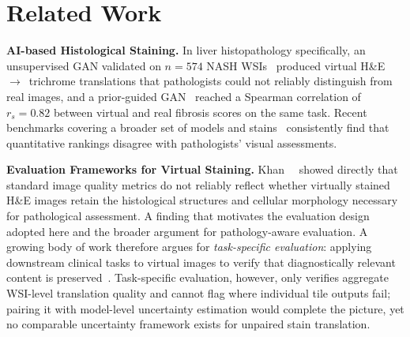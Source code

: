 \section{Related Work}
\label{sec:related_work}

\noindent\textbf{AI-based Histological Staining.}
In liver histopathology specifically, an unsupervised GAN validated on $n{=}574$ NASH
WSIs~\cite{kieffer2020largescale} produced virtual H\&E~$\to$~trichrome translations
that pathologists could not reliably distinguish from real images, and a prior-guided
GAN~\cite{li2023unpaired} reached a Spearman correlation of $r_s{=}0.82$ between virtual
and real fibrosis scores on the same task.
Recent benchmarks covering a broader set of models and stains~\cite{visgab2025,
staindiffuser2024, klockner2025he} consistently find that quantitative rankings disagree
with pathologists' visual assessments.

\noindent\textbf{Evaluation Frameworks for Virtual Staining.}
Khan~\etal~\cite{khan2023effect} showed directly that standard image quality metrics do
not reliably reflect whether virtually stained H\&E images retain the histological structures 
and cellular morphology necessary for pathological assessment. A finding that
motivates the evaluation design adopted here and the broader argument for
pathology-aware evaluation.
A growing body of work therefore argues for \textit{task-specific evaluation}: applying
downstream clinical tasks to virtual images to verify that diagnostically relevant
content is preserved~\cite{renal_seg2025, her2task2024}.
Task-specific evaluation, however, only verifies aggregate WSI-level translation quality and
cannot flag where individual tile outputs fail; pairing it with model-level uncertainty
estimation would complete the picture, yet no comparable uncertainty framework exists
for unpaired stain translation.

